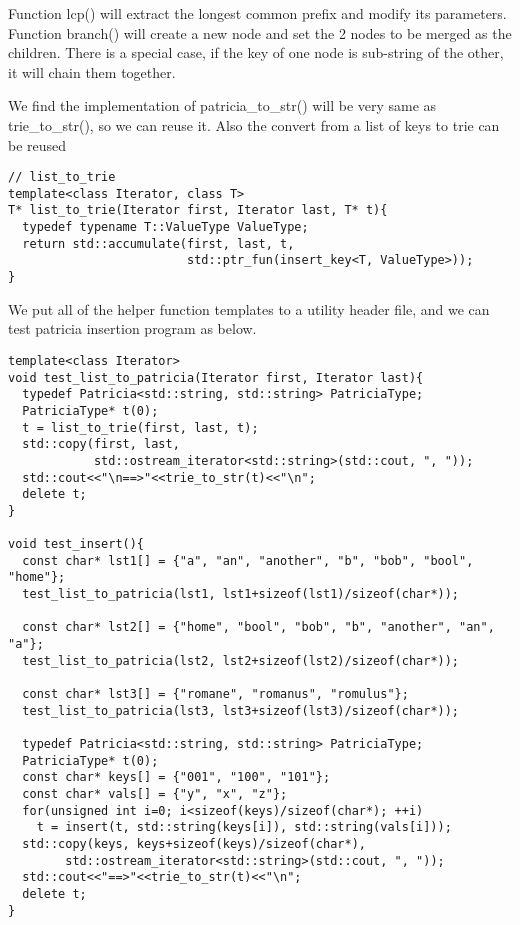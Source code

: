 \documentclass{article}
\begin{document}
Function lcp() will extract the longest common prefix and modify its
parameters. Function branch() will create a new node and set the 2
nodes to be merged as the children. There is a special case, if the
key of one node is sub-string of the other, it will chain them
together.

We find the implementation of patricia\_to\_str() will be very same
as trie\_to\_str(), so we can reuse it. Also the convert from a list
of keys to trie can be reused

\begin{lstlisting}
// list_to_trie
template<class Iterator, class T>
T* list_to_trie(Iterator first, Iterator last, T* t){
  typedef typename T::ValueType ValueType;
  return std::accumulate(first, last, t,
                         std::ptr_fun(insert_key<T, ValueType>));
}
\end{lstlisting}

We put all of the helper function templates to a utility header file,
and we can test patricia insertion program as below.

\begin{lstlisting}
template<class Iterator>
void test_list_to_patricia(Iterator first, Iterator last){
  typedef Patricia<std::string, std::string> PatriciaType;
  PatriciaType* t(0);
  t = list_to_trie(first, last, t);
  std::copy(first, last,
            std::ostream_iterator<std::string>(std::cout, ", "));
  std::cout<<"\n==>"<<trie_to_str(t)<<"\n";
  delete t;
}

void test_insert(){
  const char* lst1[] = {"a", "an", "another", "b", "bob", "bool", "home"};
  test_list_to_patricia(lst1, lst1+sizeof(lst1)/sizeof(char*));

  const char* lst2[] = {"home", "bool", "bob", "b", "another", "an", "a"};
  test_list_to_patricia(lst2, lst2+sizeof(lst2)/sizeof(char*));

  const char* lst3[] = {"romane", "romanus", "romulus"};
  test_list_to_patricia(lst3, lst3+sizeof(lst3)/sizeof(char*));

  typedef Patricia<std::string, std::string> PatriciaType;
  PatriciaType* t(0);
  const char* keys[] = {"001", "100", "101"};
  const char* vals[] = {"y", "x", "z"};
  for(unsigned int i=0; i<sizeof(keys)/sizeof(char*); ++i)
    t = insert(t, std::string(keys[i]), std::string(vals[i]));
  std::copy(keys, keys+sizeof(keys)/sizeof(char*),
	    std::ostream_iterator<std::string>(std::cout, ", "));
  std::cout<<"==>"<<trie_to_str(t)<<"\n";
  delete t;
}
\end{lstlisting}
\end{document}
